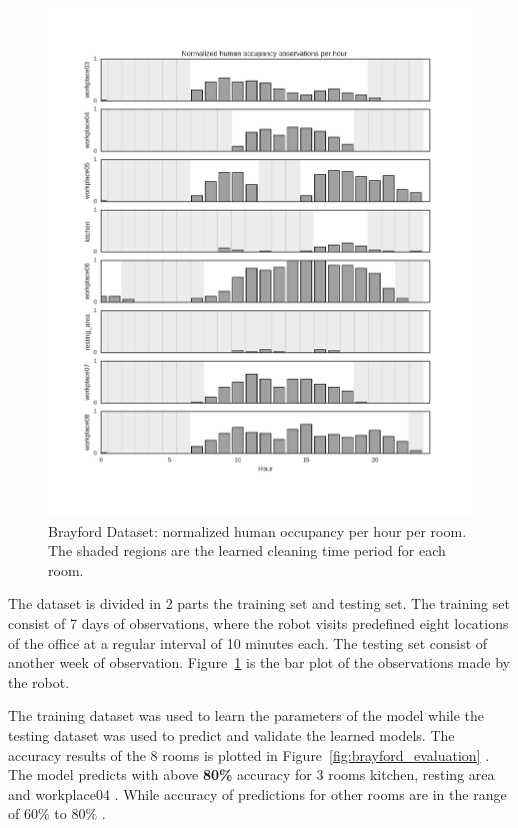 \begin{figure}[htp]
\centering
\includegraphics[width=\textwidth]{images/occupancy_hist_withresults.png}
\caption[Brayford Dataset ]{Brayford Dataset: normalized human occupancy per hour per room. The shaded regions are the learned cleaning time period for each room.}
\label{fig:brayford_visualization}
\end{figure}

\FloatBarrier



The dataset is divided in 2 parts the training set and testing set. The training set consist of 7 days of observations, where the robot visits predefined eight locations of the office at a regular interval of 10 minutes each. The testing set consist of another week of observation. Figure~\ref{fig:brayford_visualization} is the bar plot of the observations made by the robot. 



The training dataset was used to learn the parameters of the model while the testing dataset was used to predict and validate the learned models. 
The accuracy results of the 8 rooms is plotted in Figure~\ref{fig:brayford_evaluation} . The model predicts with above \textbf{80\%} accuracy for 3 rooms kitchen, resting area and workplace04 . While accuracy of predictions for other rooms are in the range of 60\% to 80\% .

